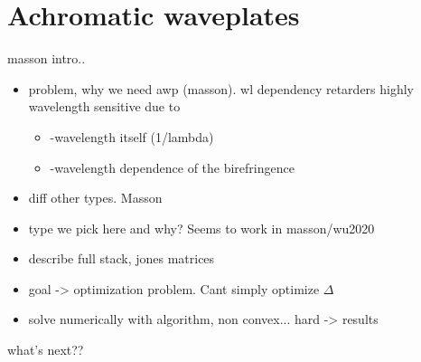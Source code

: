 \section{Achromatic waveplates}
\label{sec:achromatic_waveplates}
masson intro..
\begin{itemize}
    \item problem, why we need awp (masson). wl dependency retarders highly wavelength sensitive due to
        \begin{itemize}
            \item -wavelength itself (1/lambda)
            \item -wavelength dependence of the birefringence
        \end{itemize}
    \item diff other types. Masson
    \item type we pick here and why? Seems to work in masson/wu2020
    \item describe full stack, jones matrices
    \item goal -> optimization problem. Cant simply optimize $\Delta$
    \item solve numerically with algorithm, non convex... hard  -> results
\end{itemize}

what's next??


